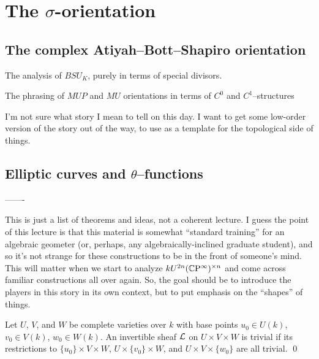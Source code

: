 
\chapter{The $\sigma$-orientation}








\section{The complex Atiyah--Bott--Shapiro orientation}

The analysis of $BSU_K$, purely in terms of special divisors.

The phrasing of $MUP$ and $MU$ orientations in terms of $C^0$ and $C^1$--structures


I'm not sure what story I mean to tell on this day.  I want to get some low-order version of the story out of the way, to use as a template for the topological side of things.


\section{Elliptic curves and $\theta$--functions}

-------

This is just a list of theorems and ideas, not a coherent lecture.  I guess the point of this lecture is that this material is somewhat ``standard training'' for an algebraic geometer (or, perhaps, any algebraically-inclined graduate student), and so it's not strange for these constructions to be in the front of someone's mind.  This will matter when we start to analyze $kU^{2n}(\mathbb{C}\mathrm P^\infty)^{\times n}$ and come across familiar constructions all over again.  So, the goal should be to introduce the players in this story in its own context, but to put emphasis on the ``shapes'' of things.

\begin{theorem}\label{TheoremOfTheCube}
Let $U$, $V$, and $W$ be complete varieties over $k$ with base points $u_0 \in U(k)$, $v_0 \in V(k)$, $w_0 \in W(k)$.  An invertible sheaf $\mathcal{L}$ on $U \times V \times W$ is trivial if its restrictions to $\{u_0\} \times V \times W$, $U \times \{v_0\} \times W$, and $U \times V \times \{w_0\}$ are all trivial. \qed
\end{theorem}

